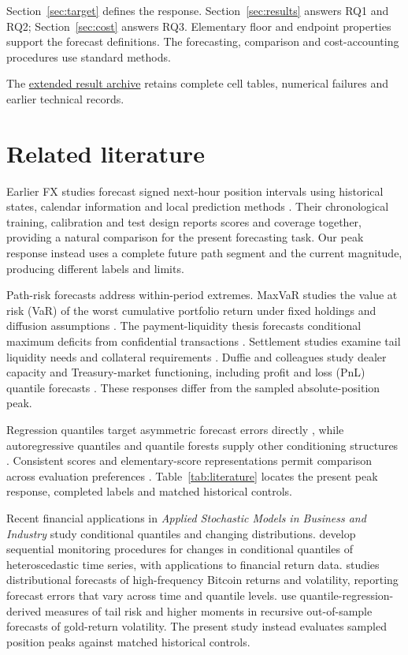 \documentclass[11pt,a4paper]{article}
\begin{document}
Section~\ref{sec:target} defines the response. Section~\ref{sec:results} answers RQ1 and RQ2; Section~\ref{sec:cost} answers RQ3. Elementary floor and endpoint properties support the forecast definitions. The forecasting, comparison and cost-accounting procedures use standard methods.

\FloatBarrier

The \href{https://github.com/ByronLi0207/financial-mathematics-paper-20261020/blob/submission-final/EXTENDED_RESULTS.md}{extended result archive} retains complete cell tables, numerical failures and earlier technical records.

\section{Related literature}\label{sec:literature}

Earlier FX studies forecast signed next-hour position intervals using historical states, calendar information and local prediction methods \citep{wisniewski2020,wisniewski2024}. Their chronological training, calibration and test design reports scores and coverage together, providing a natural comparison for the present forecasting task. Our peak response instead uses a complete future path segment and the current magnitude, producing different labels and limits.


Path-risk forecasts address within-period extremes. MaxVaR studies the value at risk (VaR) of the worst cumulative portfolio return under fixed holdings and diffusion assumptions \citep{boudoukh2004}. The payment-liquidity thesis forecasts conditional maximum deficits from confidential transactions \citep{hoogen2017}. Settlement studies examine tail liquidity needs and collateral requirements \citep{petrunia2019,arjani2020}. Duffie and colleagues study dealer capacity and Treasury-market functioning, including profit and loss (PnL) quantile forecasts \citep{duffie2023}. These responses differ from the sampled absolute-position peak.


Regression quantiles target asymmetric forecast errors directly \citep{koenker1978}, while autoregressive quantiles and quantile forests supply other conditioning structures \citep{engle2004,meinshausen2006}. Consistent scores and elementary-score representations permit comparison across evaluation preferences \citep{gneiting2011,ehm2016}. Table~\ref{tab:literature} locates the present peak response, completed labels and matched historical controls.


Recent financial applications in \emph{Applied Stochastic Models in Business and Industry} study conditional quantiles and changing distributions. \citet{LeeKim2024ASMBI} develop sequential monitoring procedures for changes in conditional quantiles of heteroscedastic time series, with applications to financial return data. \citet{Pagnottoni2026ASMBI} studies distributional forecasts of high-frequency Bitcoin returns and volatility, reporting forecast errors that vary across time and quantile levels. \citet{MuddanaEtAl2025ASMBI} use quantile-regression-derived measures of tail risk and higher moments in recursive out-of-sample forecasts of gold-return volatility. The present study instead evaluates sampled position peaks against matched historical controls.
\end{document}

